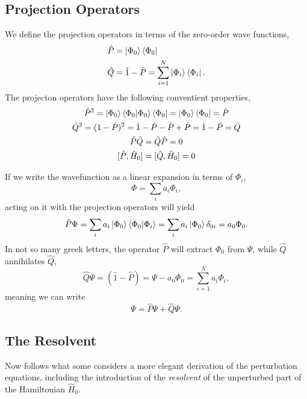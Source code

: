 \subsection{Projection Operators}
We define the projection operators in terms of the zero-order wave functions,
\begin{equation}
    \begin{aligned}
        \hat{P} &= \ket{\Phi_0} \bra{\Phi_0} \\
        \hat{Q} &= \hat{1} - \hat{P} = \sum_{i=1}^N \ket{\Phi_i} \bra{\Phi_i}.
    \end{aligned}
\end{equation}
The projecton operators have the following conventient properties,
\begin{equation}
    \begin{gathered}
    \hat{P}^2 =  \ket{\Phi_0}\bra{\Phi_0}\ket{\Phi_0}\bra{\Phi_0} 
        = \ket{\Phi_0}\bra{\Phi_0} = \hat{P} \\
    \hat{Q}^2 = (1 - \hat{P})^2 = \hat{1} - \hat{P} - \hat{P} + \hat{P}
        = \hat{1} - \hat{P} = \hat{Q} \\
    \hat{P}\hat{Q} = \hat{Q} \hat{P} = 0 \\
    [ \hat{P}, \hat{H}_0 ] = [ \hat{Q}, \hat{H}_0 ] = 0
    \end{gathered}
\end{equation}

If we write the wavefunction as a linear expansion in terms of $\Phi_i$,
\begin{equation}
    \Phi = \sum_i a_i \Phi_i,
\end{equation}
acting on it with the projection operators will yield
\begin{equation}
    \hat{P} \Psi = \sum_i a_i \ket{\Phi_0}\bra{\Phi_0}\ket{\Phi_i}
        = \sum_i a_i\ket{\Phi_0}\delta_{0i} = a_0\Phi_0.
\end{equation}
In not so many greek letters, the operator $\hat{P}$ will extract $\Phi_0$ from 
$\Psi$, while $\hat{Q}$ annihilates $\hat{Q}$,
\begin{equation}
    \hat{Q}\Psi = (\hat{1} - \hat{P}) = \Psi - a_0\Phi_0 
        = \sum_{i=1}^N a_i\Phi_i,
\end{equation}
meaning we can write
\begin{equation}
    \Psi = \hat{P} \Psi + \hat{Q} \Psi.
\end{equation}

\subsection{The Resolvent}
Now follows what some considers a more elegant derivation of the perturbation equations,
including the introduction of the \emph{resolvent} of the unperturbed part of the Hamiltonian
$\hat{H}_0$.

